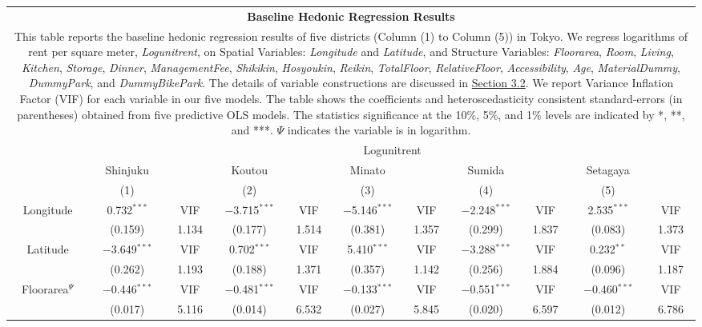 \documentclass[a4paper, 12pt]{article} %
\newcommand{\var}[1][\textit]{#1}
\begin{document}
\newpage
\begin{landscape}

\begin{longtable}[c]{ccccccccccc}
\label{tb3} \\
\multicolumn{11}{c}{\textbf{Baseline Hedonic Regression Results}} \\
\multicolumn{11}{p{21.5cm}}{This table reports the baseline hedonic regression results of five districts (Column (1) to Column (5)) in Tokyo. We regress logarithms of rent per square meter, \var{Logunitrent}, on Spatial Variables: \var{Longitude} and \var{Latitude}, and Structure Variables: \var{Floorarea}, \var{Room}, \var{Living}, \var{Kitchen}, \var{Storage}, \var{Dinner}, \var{ManagementFee}, \var{Shikikin}, \var{Hosyoukin}, \var{Reikin}, \var{TotalFloor}, \var{RelativeFloor}, \var{Accessibility}, \var{Age}, \var{MaterialDummy}, \var{DummyPark}, and \var{DummyBikePark}. The details of variable constructions are discussed in \hyperref[sec32]{Section 3.2}. We report Variance Inflation Factor (VIF) for each variable in our five models. The table shows the coefficients and heteroscedasticity consistent standard-errors (in parentheses) obtained from five predictive OLS models. The statistics significance at the 10\%, 5\%, and 1\% levels are indicated by *, **, and ***. $\Psi$ indicates the variable is in logarithm.} \\
\hline
 & \multicolumn{10}{c}{Logunitrent} \\
& Shinjuku & & Koutou & & Minato & & Sumida & & Setagaya & \\
& (1) & & (2) & & (3) & & (4) & & (5) & \\
\hline
\addlinespace[0.5em]
Longitude & 0.732$^{***}$ & VIF & $-$3.715$^{***}$ & VIF & $-$5.146$^{***}$ & VIF & $-$2.248$^{***}$ & VIF & 2.535$^{***}$ & VIF \\
& (0.159) & 1.134 & (0.177) & 1.514 & (0.381) & 1.357 & (0.299) & 1.837 & (0.083) & 1.373 \\
\addlinespace[0.5em]
Latitude & $-$3.649$^{***}$ & VIF & 0.702$^{***}$ & VIF & 5.410$^{***}$ & VIF & $-$3.288$^{***}$ & VIF & 0.232$^{**}$ & VIF \\
& (0.262) & 1.193 & (0.188) & 1.371 & (0.357) & 1.142 & (0.256) & 1.884 & (0.096) & 1.187 \\
\addlinespace[0.5em]
Floorarea$^\Psi$ & $-$0.446$^{***}$ & VIF & $-$0.481$^{***}$ & VIF & $-$0.133$^{***}$ & VIF & $-$0.551$^{***}$ & VIF & $-$0.460$^{***}$ & VIF \\
& (0.017) & 5.116 & (0.014) & 6.532 & (0.027) & 5.845 & (0.020) & 6.597 & (0.012) & 6.786 \\

\end{longtable}
\end{landscape}
\end{document}
